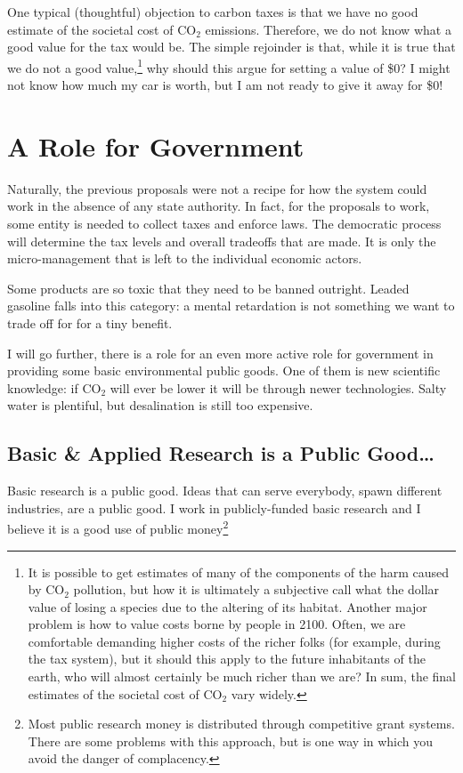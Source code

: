 One typical (thoughtful) objection to carbon taxes is that we have no good
estimate of the societal cost of CO${}_2$ emissions. Therefore, we do not know
what a good value for the tax would be. The simple rejoinder is that, while it
is true that we do not a good value,\footnote{It is possible to get estimates
of many of the components of the harm caused by CO${}_2$ pollution, but how it
is ultimately a subjective call what the dollar value of losing a species due
to the altering of its habitat. Another major problem is how to value costs
borne by people in 2100. Often, we are comfortable demanding higher costs of
the richer folks (for example, during the tax system), but it should this apply
to the future inhabitants of the earth, who will almost certainly be much
richer than we are? In sum, the final estimates of the societal cost of
CO${}_2$ vary widely.} why should this argue for setting a value of \$0? I
might not know how much my car is worth, but I am not ready to give it away for
\$0!

\section{A Role for Government}

Naturally, the previous proposals were not a recipe for how the system could
work in the absence of any state authority. In fact, for the proposals to work,
some entity is needed to collect taxes and enforce laws. The democratic process
will determine the tax levels and overall tradeoffs that are made. It is only
the micro-management that is left to the individual economic actors.

Some products are so toxic that they need to be banned outright. Leaded
gasoline falls into this category: a mental retardation is not something we
want to trade off for for a tiny benefit.

I will go further, there is a role for an even more active role for government
in providing some basic environmental public goods. One of them is new
scientific knowledge: if CO${}_2$ will ever be lower it will be through newer
technologies. Salty water is plentiful, but desalination is still too
expensive.

\subsection{Basic \& Applied Research is a Public Good\ldots}

Basic research is a public good. Ideas that can serve everybody, spawn
different industries, are a public good. I work in publicly-funded basic
research and I believe it is a good use of public money\footnote{Most public
research money is distributed through competitive grant systems. There are some
problems with this approach, but is one way in which you avoid the danger of
complacency.}

